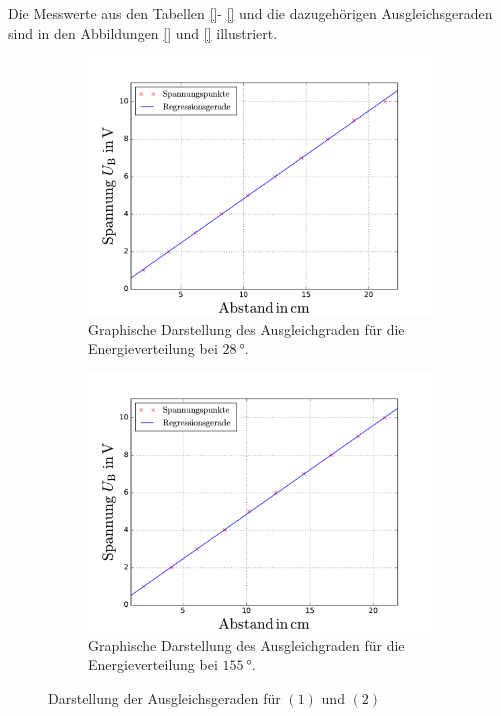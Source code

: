 Die Messwerte aus den Tabellen \ref{}- \ref{} und die dazugehörigen Ausgleichsgeraden sind in
den Abbildungen \ref{} und \ref{} illustriert.
\begin{figure}
  \centering
  \begin{subfigure}{0.48\textwidth}
    \centering
    \includegraphics[width=1 \textwidth]{../Messdaten/zim.pdf}
    \caption{Graphische Darstellung des Ausgleichgraden für die Energieverteilung bei $\SI{28}{\degree}$.}
    \label{fig: energie_zim}
  \end{subfigure}
  \begin{subfigure}{0.48\textwidth}
    \centering
    \includegraphics[width=1 \textwidth]{../Messdaten/spannungsfit_energieverteilung_150grad.pdf}
    \caption{Graphische Darstellung des Ausgleichgraden für die Energieverteilung bei $\SI{155}{\degree}$.}
    \label{fig: enrgie_hot}
  \end{subfigure}
  \caption{Darstellung der Ausgleichsgeraden für $(1)$ und $(2)$}
  \label{fig: darstellung_1}
\end{figure}

